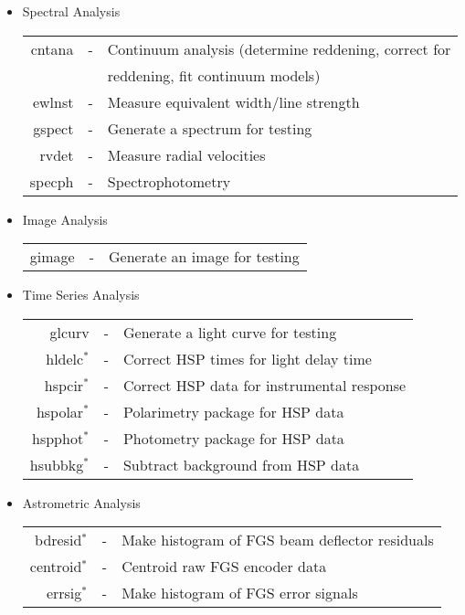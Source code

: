 \begin{itemize}
\item Spectral Analysis \\

\begin{tabular}{rcl}
   cntana & - & Continuum analysis (determine reddening, correct for\\
                     & &  \quad reddening, fit continuum models)\\
   ewlnst & - & Measure equivalent width/line strength\\
   gspect & - & Generate a spectrum for testing\\
   rvdet & - & Measure radial velocities\\
   specph & - & Spectrophotometry
\end{tabular}

\item Image Analysis \\

\begin{tabular}{rcl}
   gimage & - & Generate an image for testing\\
\end{tabular}

\clearpage
\item Time Series Analysis \\

\begin{tabular}{rcl}
   glcurv & - & Generate a light curve for testing\\
   hldelc$^*$ & - & Correct HSP times for light delay time\\
   hspcir$^*$ & - & Correct HSP data for instrumental response\\
   hspolar$^*$ & - & Polarimetry package for HSP data\\
   hspphot$^*$ & - & Photometry package for HSP data\\
   hsubbkg$^*$ & - & Subtract background from HSP data
\end{tabular}

\item Astrometric Analysis \\

\begin{tabular}{rcl}
   bdresid$^*$ & - & Make histogram of FGS beam deflector residuals\\
   centroid$^*$ & - & Centroid raw FGS encoder data\\
   errsig$^*$ & - & Make histogram of FGS error signals
\end{tabular}

\end{itemize}

